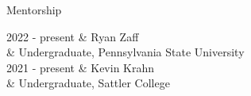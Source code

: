 \begin{rSection}{Mentorship}
	\begin{timeline}
		2022 - present & Ryan Zaff \\
			& Undergraduate, Pennsylvania State University \smallskip \\
		2021 - present & Kevin Krahn \\
			& Undergraduate, Sattler College
	\end{timeline}
\end{rSection}